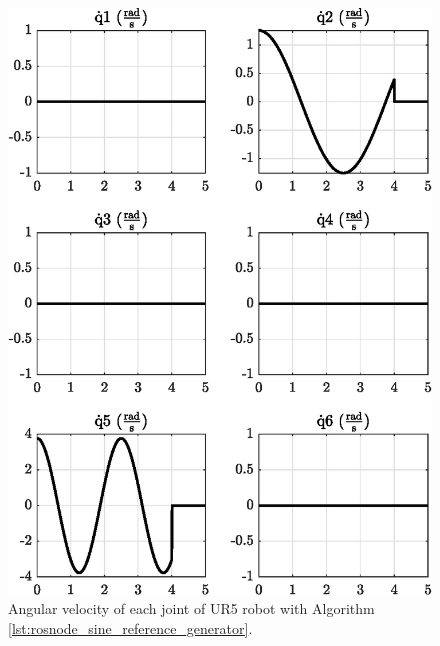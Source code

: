 \begin{figure}
    \centering
    \includegraphics{images/exp1.1/joint_velocity.eps}
    \caption{Angular velocity of each joint of UR5 robot with Algorithm \ref{lst:rosnode_sine_reference_generator}.}
    \label{fig:act1.1_joint_velocity}
\end{figure}


